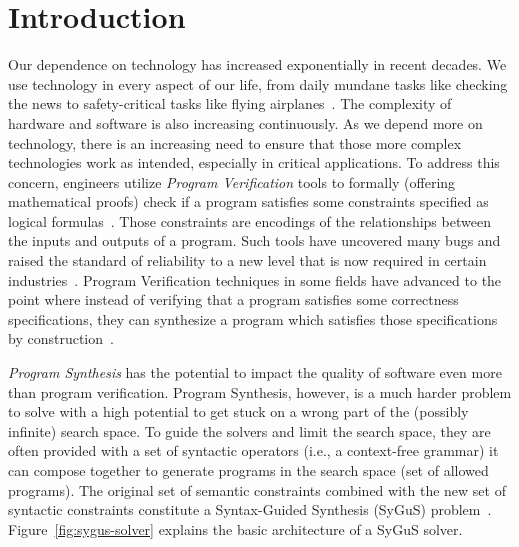 \section{Introduction}
\label{sec:introduction}
Our dependence on technology has increased exponentially in recent decades.
%
We use technology in every aspect of our life, from daily mundane tasks like checking the news to safety-critical tasks like flying airplanes~\cite{safety:2002}.
%
The complexity of hardware and software is also increasing continuously.
%
As we depend more on technology, there is an increasing need to ensure that those more complex technologies work as intended, especially in critical applications.
%
To address this concern, engineers utilize \emph{Program Verification} tools
%
to formally (offering mathematical proofs) check if a program satisfies some constraints specified as logical formulas~\cite{cvc5:2022}.
%
Those constraints are encodings of the relationships between the inputs and outputs of a program.
%
Such tools have uncovered many bugs and raised the standard of reliability to a new level that is now required in certain industries~\cite{standards:1993}.
%
Program Verification techniques in some fields have advanced to the point where instead of verifying that a program satisfies some correctness specifications,
%
they can synthesize a program which satisfies those specifications by construction~\cite{cvc4:2015}.

\emph{Program Synthesis} has the potential to impact the quality of software even more than program verification.
Program Synthesis, however, is a much harder problem to solve with a high potential to get stuck on a wrong part of the (possibly infinite) search space.
%
To guide the solvers and limit the search space, they are often provided with a set of syntactic operators (i.e., a context-free grammar) it can compose together to generate programs in the search space (set of allowed programs).
%
The original set of semantic constraints combined with the new set of syntactic constraints constitute a Syntax-Guided Synthesis (SyGuS) problem~\cite{sygus:2013}. Figure~\ref{fig:sygus-solver} explains the basic architecture of a SyGuS solver.


